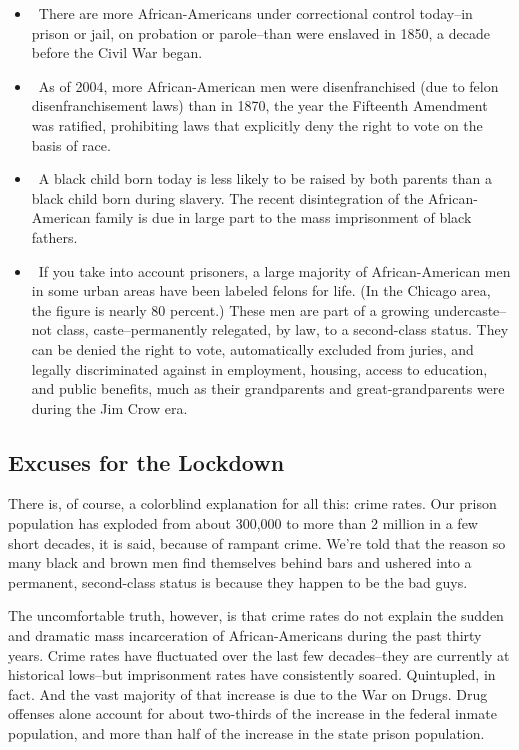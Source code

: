 \documentclass[10pt,a4paper]{article}
\begin{document}
\begin{itemize}
\item There are more African-Americans under correctional control today–in prison or jail, on probation or parole–than were enslaved in 1850, a decade before the Civil War began.
\item As of 2004, more African-American men were disenfranchised (due to felon disenfranchisement laws) than in 1870, the year the Fifteenth Amendment was ratified, prohibiting laws that explicitly deny the right to vote on the basis of race.
\item A black child born today is less likely to be raised by both parents than a black child born during slavery. The recent disintegration of the African-American family is due in large part to the mass imprisonment of black fathers.
\item If you take into account prisoners, a large majority of African-American men in some urban areas have been labeled felons for life. (In the Chicago area, the figure is nearly 80 percent.) These men are part of a growing undercaste–not class, caste–permanently relegated, by law, to a second-class status. They can be denied the right to vote, automatically excluded from juries, and legally discriminated against in employment, housing, access to education, and public benefits, much as their grandparents and great-grandparents were during the Jim Crow era.
\end{itemize}

\subsection{Excuses for the Lockdown}
There is, of course, a colorblind explanation for all this: crime rates. Our prison population has exploded from about 300,000 to more than 2 million in a few short decades, it is said, because of rampant crime. We’re told that the reason so many black and brown men find themselves behind bars and ushered into a permanent, second-class status is because they happen to be the bad guys.

The uncomfortable truth, however, is that crime rates do not explain the sudden and dramatic mass incarceration of African-Americans during the past thirty years. Crime rates have fluctuated over the last few decades–they are currently at historical lows–but imprisonment rates have consistently soared. Quintupled, in fact. And the vast majority of that increase is due to the War on Drugs. Drug offenses alone account for about two-thirds of the increase in the federal inmate population, and more than half of the increase in the state prison population.
\end{document}
